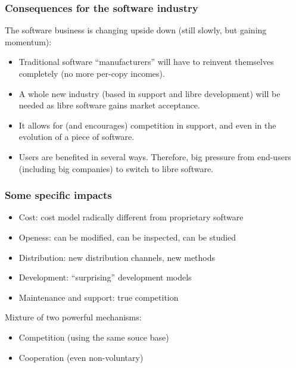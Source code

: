 
\begin{frame}
\frametitle{Consequences for the software industry}

The software business is changing upside down (still slowly, but
gaining momentum):

\begin{itemize} 
\item Traditional software ``manufacturers'' will have to reinvent
  themselves completely (no more per-copy incomes).
\item A whole new industry (based in support and libre development)
  will be needed as libre software gains market acceptance.
\item It allows for (and encourages) competition in support, and even
  in the evolution of a piece of software.
\item Users are benefited in several ways. Therefore, big pressure
  from end-users (including big companies) to switch to libre software.
\end{itemize}

\end{frame}


\begin{frame}
\frametitle{Some specific impacts}

\begin{itemize} 
\item Cost: cost model radically different from proprietary software
\item Openess: can be modified, can be inspected, can be studied
\item Distribution: new distribution channels, new methods
\item Development: ``surprising'' development models
\item Maintenance and support: true competition
\end{itemize}

Mixture of two powerful mechanisms:

\begin{itemize}
\item Competition (using the same souce base)
\item Cooperation (even non-voluntary)
\end{itemize}

\end{frame}

